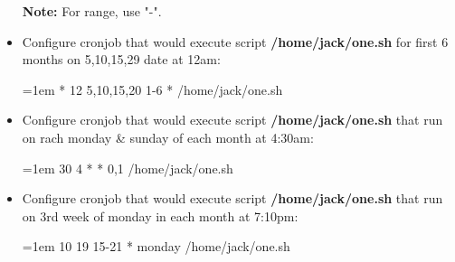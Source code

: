 \begin{flushleft}
\begin{itemize}
		\begin{tcolorbox}[breakable,notitle,boxrule=-0pt,colback=yellow,colframe=yellow]
			\color{black}
			\textbf{Note:} For range, use "-".
		\end{tcolorbox}
	
		\bigskip
		\bigskip
		\item Configure cronjob that would execute script \textbf{/home/jack/one.sh} for first 6 months on 5,10,15,29 date at 12am:
		\begin{tcolorbox}[breakable,notitle,boxrule=-0pt,colback=teal,colframe=teal]
			\color{white}
			\font=1em
			*     12    5,10,15,20   1-6  *     /home/jack/one.sh
			\font=4pt
		\end{tcolorbox}
		
		\bigskip
		\bigskip
		\item Configure cronjob that would execute script \textbf{/home/jack/one.sh} that run on rach monday \& sunday of each month at 4:30am:	
		\begin{tcolorbox}[breakable,notitle,boxrule=-0pt,colback=teal,colframe=teal]
			\color{white}
			\font=1em
			30     4    *  *   0,1     /home/jack/one.sh
			\font=4pt
		\end{tcolorbox}
		
		\bigskip
		\bigskip
		\item Configure cronjob that would execute script \textbf{/home/jack/one.sh} that run on 3rd week of monday in each month at 7:10pm:
		\begin{tcolorbox}[breakable,notitle,boxrule=-0pt,colback=teal,colframe=teal]
			\color{white}
			\font=1em
			10   19  15-21  *  monday     /home/jack/one.sh
			\font=4pt
		\end{tcolorbox}
		
	
	\end{itemize}

	 


\end{flushleft}
\newpage


